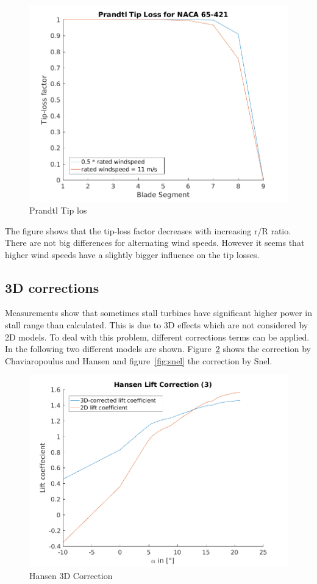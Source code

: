 \documentclass[10pt]{article}
\begin{document}
\begin{figure}[H]
\centering
\includegraphics[width=0.8\linewidth]{../CIP_2/Figures/prandtl_tip_loss.png}
\caption{Prandtl Tip los}
\label{fig:tiplos}
\end{figure}

The figure shows that the tip-loss factor decreases with increasing r/R ratio. There are not big differences for alternating wind speeds. However it seems that higher wind speeds have a slightly bigger influence on the tip losses.

\subsection{3D corrections}
Measurements show that sometimes stall turbines have significant higher power in stall range than calculated. This is due to 3D effects which are not considered by 2D models. To deal with this problem, different corrections terms can be applied.
In the following two different models are shown. Figure~\ref{fig:hansen} shows the correction by Chaviaropoulus and Hansen and figure~\ref{fig:snel} the correction by Snel. 

\begin{figure}[H]
\centering
\includegraphics[width=0.8\linewidth]{../CIP_2/Figures/hansen_lift_correction_3.png}
\caption{Hansen 3D Correction}
\label{fig:hansen}
\end{figure}
\end{document}
